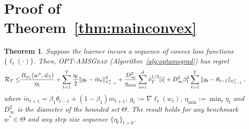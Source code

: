 \documentclass[11pt]{article}
\newtheorem*{Theorem*}{Theorem}
\theoremstyle{k}
\begin{document}
\clearpage




\clearpage


\appendix
\section{Proof of Theorem~\ref{thm:mainconvex}}\label{app:thmmainconvex}
\begin{Theorem*}
Suppose the learner incurs a sequence of convex loss functions $\{ \ell_{t}(\cdot) \}$.
Then,  \textsc{OPT-AMSGrad} (Algorithm~\ref{alg:optamsgrad}) has regret 
\begin{equation}\notag
\begin{aligned}
\mathcal{R}_T \leq &   \frac{ B_{\psi_1}(w^*, \tilde{w}_{1})}{\eta_1}
+ \sum_{t=1}^T\frac{\eta_t}{2} \| g_t - \tilde{m}_t  \|_{\psi_{t-1}^*}^2  + \frac{D_{\infty}^2}{\eta_{\min}}  \sum_{i=1}^d \hat{v}_{T}^{1/2}[i] + D_{\infty}^2\beta_1^2   \sum_{t=1}^T  \| g_t - \theta_{t-1}  \|_{\psi_{t-1}^*}\;,
\end{aligned}
\end{equation}
where $ \tilde{m}_{t+1}  = \beta_1 \theta_{t-1} +(1-\beta_1) m_{t+1}$, $g_{t}:= \nabla \ell_{t}(w_t)$, $\eta_{{\min}} := \min_{{t}} \eta_{t}$ and $D_{\infty}^2$ is the diameter of the bounded set $\Theta$.
The result holds for any benchmark $w^{*} \in \Theta$ and any step size sequence $\{ \eta_t \}_{t>0}$.
\end{Theorem*}
\end{document}

